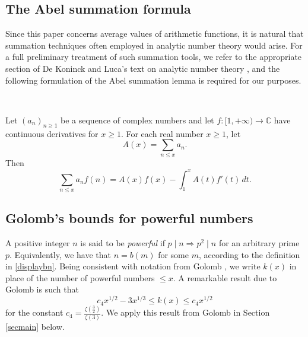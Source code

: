\documentclass[12pt]{article}
\begin{document}
\subsection{The Abel summation formula}
 Since this paper concerns average values of arithmetic functions, it is natural that summation techniques often employed in analytic 
 number theory would arise. For a full preliminary treatment of such summation tools, we refer to the appropriate section of De Koninck 
 and Luca's text on analytic number theory \cite[\S1]{DeKoninckLuca2012}, and the following formulation of the Abel summation lemma is 
 required for our purposes. 
 
 \ 

 Let $( a_{n} )_{n \geq 1}$ be a sequence of complex numbers and let $f : [1, +\infty) \to 
 \mathbb{C}$ have continuous derivatives for $x \geq 1$. For each real number $x \geq 1$, let $$ A(x) = \sum_{n \leq x} a_n. $$ Then 
 \begin{equation}\label{eq1p4} 
 \sum_{n \leq x} a_{n} f(n) = A(x) f(x) - \int_{1}^{x} A(t) f'(t) \, dt. 
 \end{equation}

\subsection{Golomb's bounds for powerful numbers}
 A positive integer $n$ is said to be \emph{powerful} if $p \mid n \Longrightarrow p^2 \mid n$ for an arbitrary prime $p$. Equivalently, 
 we have that $n = b(m)$ for some $m$, according to the definition in \eqref{displaybn}. Being consistent with notation from Golomb 
 \cite{Golomb1970}, we write $k(x)$ in place of the number of powerful numbers $\leq x$. A remarkable result due to Golomb is such that 
\begin{equation}\label{displayGolomb}
 c_4 x^{1/2} - 3 x^{1/3} \leq k(x) \leq c_4 x^{1/2} 
\end{equation}
 for the constant $c_4 = \frac{\zeta\left( \frac{3}{2} \right)}{\zeta(3)}$. We apply this result from Golomb in Section \ref{secmain} below. 
\end{document}
